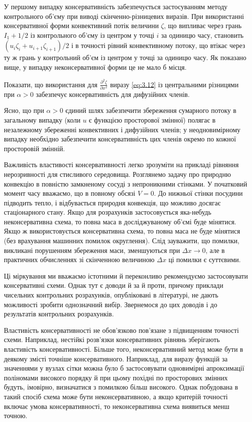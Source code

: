 У першому випадку консервативність забезпечується застосуванням методу контрольного об'\-єму при виводі скінченно-різницевих виразів. При використанні консервативної форми конвективний потік величини $\zeta$, що випливає через грань $I_1 + 1/2$ із контрольного об'єму із центром у точці $i$ за одиницю часу, становить $(u_i\zeta_i+u_{i+1}\zeta_{i+1})/2$ і в точності рівний конвективному потоку, що втікає через ту ж грань у контрольний об'єм із центром у точці  за одиницю часу. Як показано вище, у випадку неконсервативної форми це не мало б місця.

\begin{exercise}
    Показати, що використання для $\frac{\partial^2 \zeta}{\partial x^2}$ виразу \eqref{eq:3.12} із центральними різницями при $\alpha > 0$ забезпечує консервативність для дифузійних членів.
\end{exercise}

Ясно, що при $\alpha > 0$ єдиний шлях забезпечити збереження сумарного потоку в загальному випадку (коли $u$ є функцією просторової змінної) полягає в незалежному збереженні конвективних і дифузійних членів; у неодновимірному випадку необхідно забезпечити консервативність цих членів окремо по кожної просторовій змінній. \medskip

Важливість властивості консервативності легко зрозуміти на прикладі рівняння нерозривності для стисливого середовища. Розглянемо задачу про природню конвекцію в повністю замкненому сосуді з непроникними стінками. У початковий момент часу вважаємо, що в повному обсязі $V = 0$. До нижньої стінки посудини підводить тепло, і відбувається природня конвекція, що можливо досягає стаціонарного стану. Якщо для розрахунків застосовується яка-небудь неконсервативна схема, то повна маса в досліджуваному об'ємі буде мінятися. Якщо ж використовується консервативна схема, то повна маса не буде мінятися (без врахування машинних помилок округлення). Слід зауважити, що помилки, викликані порушенням збереження маси, зменшуються при $\Delta x \to 0$, але в практичних обчисленнях зі скінченною величиною $\Delta x$ ці помилки є суттєвими. \medskip

Ці міркування ми вважаємо істотними й переконливо рекомендуємо застосовувати консервативні схеми. Однак тут є доводи й за й проти, причому приклади чисельних контрольних розрахунків, опубліковані в літературі, не дають можливості зробити однозначний вибір. Звернемося до цих доводів і до результатів контрольних розрахунків. \medskip

Властивість консервативності не обов'язково пов'язане з підвищенням точності схеми. Наприклад, нестійкі розв'язки консервативних рівнянь зберігають властивість консервативності. Більше того, неконсервативний метод може бути в деякому змісті точніше консервативного. Наприклад, для виразу функцій за значеннями у вузлах сітки можна було б застосовувати одновимірні апроксимації поліномами високого порядку й при цьому похідні по просторових змінних будуть, імовірно, визначатися з помилкою більш високого. Однак побудована в такий спосіб схема може бути неконсервативною, а якщо критерій точності включає умова консервативності, то неконсервативна схема виявиться менш точною. \medskip

